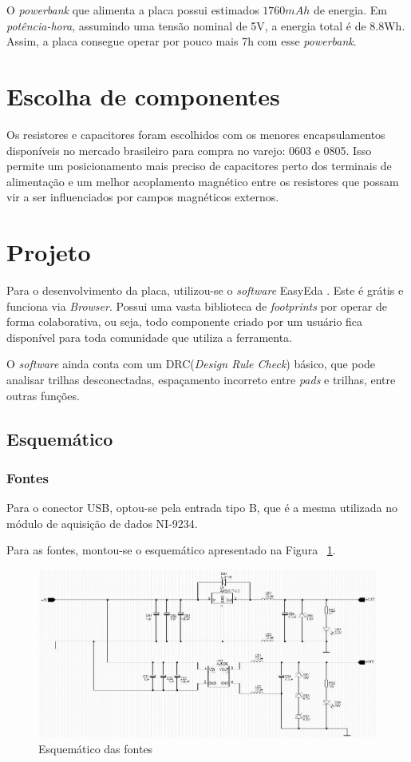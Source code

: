 \documentclass[
	12pt,				%
	openright,			%
	twoside,			%
	a4paper,			%
	english,			%
	french,				%
	spanish,			%
	brazil,				%
	]{abntex2}
\begin{document}
		O \textit{powerbank} que alimenta a placa possui estimados $1760mAh$ de
		energia. Em \textit{potência-hora}, assumindo uma tensão nominal
		de 5V, a energia total é de 8.8Wh. Assim, a placa consegue operar
		por pouco mais 7h com esse \textit{powerbank}.

	\section{Escolha de componentes}
		Os resistores e capacitores foram escolhidos com os menores
		encapsulamentos disponíveis no mercado brasileiro para compra no varejo:
		0603 e 0805. Isso permite um posicionamento mais preciso de capacitores
		perto dos terminais de alimentação e um melhor acoplamento magnético
		entre os resistores que possam vir a ser influenciados por campos
		magnéticos externos.

	\section{Projeto}
		Para o desenvolvimento da placa, utilizou-se o \textit{software}
		EasyEda \cite{easyEda}. Este é grátis e funciona via \textit{Browser}. Possui uma
		vasta biblioteca de \textit{footprints} por operar de forma
		colaborativa, ou seja, todo componente criado por um usuário fica
		disponível para toda comunidade que utiliza a ferramenta.

		O \textit{software} ainda conta com um DRC(\textit{Design Rule
		Check}) básico, que pode analisar trilhas desconectadas, espaçamento
		incorreto entre \textit{pads} e trilhas, entre outras funções.
		\subsection{Esquemático}
			\subsubsection{Fontes}
				Para o conector USB, optou-se pela entrada tipo B, que é a
				mesma utilizada no módulo de aquisição de dados NI-9234.

				Para as fontes, montou-se o esquemático apresentado na Figura ~\ref{fig:esquematicoFontes}.

				\begin{figure}[!ht]
					\centering
					\includegraphics[width=\linewidth]{../Fotos/fonte.jpg}
					\caption{Esquemático das fontes}
					\label{fig:esquematicoFontes}
				\end{figure}
\end{document}
